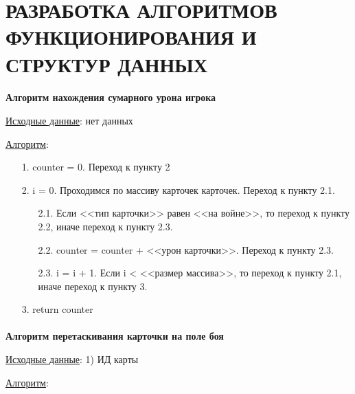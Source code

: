 \documentclass[12pt, a4paper, simple]{eskdtext}
\begin{document}
    \newpage
    
    \section{РАЗРАБОТКА АЛГОРИТМОВ ФУНКЦИОНИРОВАНИЯ И СТРУКТУР ДАННЫХ}

    \paragraph{} \textbf{Алгоритм нахождения сумарного урона игрока}

    \underline{Исходные данные}: нет данных

    \underline{Алгоритм}:

    \begin{enumerate}
        \item[1.] counter = 0. Переход к пункту 2
        \item[2.] i = 0. Проходимся по массиву карточек карточек. Переход к пункту 2.1.
        \begin{enumerate}
            \item[2.1.] Если <<тип карточки>> равен <<на войне>>, то переход к пункту 2.2, иначе переход к пункту 2.3.
            \item[2.2.] counter = counter + <<урон карточки>>. Переход к пункту 2.3.
            \item[2.3.] i = i + 1. Если i < <<размер массива>>, то переход к пункту 2.1, иначе переход к пункту 3.
        \end{enumerate}
        \item[3.] return counter
    \end{enumerate}

    \paragraph{} \textbf{Алгоритм перетаскивания карточки на поле боя}

    \underline{Исходные данные}: 1) ИД карты

    \underline{Алгоритм}:
\end{document}
